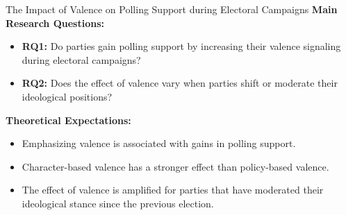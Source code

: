 \documentclass[9pt, aspectratio=169]{beamer}
\begin{document}
\begin{frame}{The Impact of Valence on Polling Support during Electoral Campaigns}
    \textbf{Main Research Questions:}     \vspace{0.2cm}
    \begin{itemize}
        \item \textbf{RQ1:} Do parties gain polling support by increasing their valence signaling during electoral campaigns?\vspace{0.2cm}
        \item \textbf{RQ2:} Does the effect of valence vary when parties shift or moderate their ideological positions?\vspace{0.2cm}
    \end{itemize}
\vspace{0.3cm}
    \textbf{Theoretical Expectations:} 
    \begin{itemize}
        \item Emphasizing valence is associated with gains in polling support.\vspace{0.2cm}
        \item Character-based valence has a stronger effect than policy-based valence.\vspace{0.2cm}
        \item The effect of valence is amplified for parties that have moderated their ideological stance since the previous election.
    \end{itemize}
\end{frame}
\end{document}

